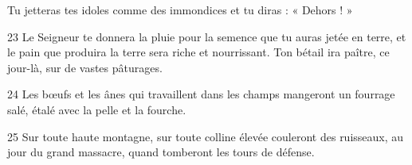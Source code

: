 Tu jetteras tes idoles comme des immondices et tu diras : « Dehors ! »

23 Le Seigneur te donnera la pluie pour la semence que tu auras jetée en terre, et le pain que produira la terre sera riche et nourrissant. Ton bétail ira paître, ce jour-là, sur de vastes pâturages.

24 Les bœufs et les ânes qui travaillent dans les champs mangeront un fourrage salé, étalé avec la pelle et la fourche.

25 Sur toute haute montagne, sur toute colline élevée couleront des ruisseaux, au jour du grand massacre, quand tomberont les tours de défense.
